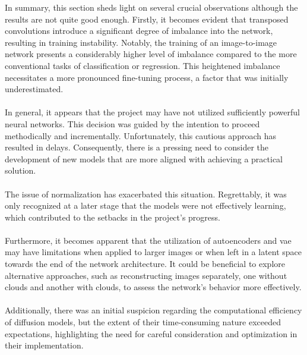 In summary, this section sheds light on several crucial observations although the results are not quite good enough. Firstly, it becomes evident that transposed convolutions introduce a significant degree of imbalance into the network, resulting in training instability. Notably, the training of an image-to-image network presents a considerably higher level of imbalance compared to the more conventional tasks of classification or regression. This heightened imbalance necessitates a more pronounced fine-tuning process, a factor that was initially underestimated.
\\
\\
In general, it appears that the project may have not utilized sufficiently powerful neural networks. This decision was guided by the intention to proceed methodically and incrementally. Unfortunately, this cautious approach has resulted in delays. Consequently, there is a pressing need to consider the development of new models that are more aligned with achieving a practical solution.
\\
\\
The issue of normalization has exacerbated this situation. Regrettably, it was only recognized at a later stage that the models were not effectively learning, which contributed to the setbacks in the project's progress.
\\
\\
Furthermore, it becomes apparent that the utilization of autoencoders and \gls{vae} may have limitations when applied to larger images or when left in a latent space towards the end of the network architecture. It could be beneficial to explore alternative approaches, such as reconstructing images separately, one without clouds and another with clouds, to assess the network's behavior more effectively.
\\
\\
Additionally, there was an initial suspicion regarding the computational efficiency of diffusion models, but the extent of their time-consuming nature exceeded expectations, highlighting the need for careful consideration and optimization in their implementation.
